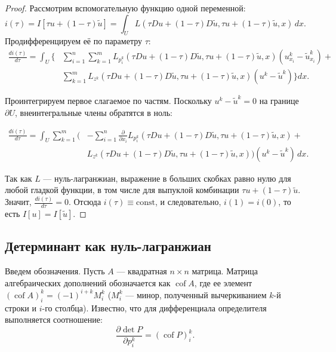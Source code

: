 \begin{proof}
    Рассмотрим вспомогательную функцию одной переменной:
    \begin{equation}
        i(\tau) = I[\tau u + (1-\tau)\tilde{u}] 
        = \int_U L(\tau Du + (1-\tau)D\tilde{u}, \tau u + (1-\tau)\tilde{u}, x) \, dx.
    \end{equation}
    Продифференцируем её по параметру $\tau$:
\begin{equation}
\begin{split}
    \frac{di(\tau)}{d\tau} = \int_U \bigg\{ 
    &\sum_{i=1}^n \sum_{k=1}^m L_{p_i^k}(
      \tau Du + (1-\tau)D\tilde{u}, \tau u + (1-\tau)\tilde{u}, x
      )(u_{x_i}^k - \tilde{u}_{x_i}^k) + \\
    &\sum_{k=1}^m L_{z^k}(
      \tau Du + (1-\tau)D\tilde{u}, \tau u + (1-\tau)\tilde{u}, x
      ) (u^k - \tilde{u}^k)
    \bigg\} dx.
\end{split}
\end{equation}

Проинтегрируем первое слагаемое по частям. 
Поскольку $u^k - \tilde{u}^k = 0$ на границе $\partial U$, 
внеинтегральные члены обратятся в ноль:

\begin{equation}
\begin{split}
    \frac{di(\tau)}{d\tau} = \int_U \sum_{k=1}^m \bigg( 
    &- \sum_{i=1}^n \frac{\partial}{\partial x_i} L_{p_i^k}(
      \tau Du + (1-\tau)D\tilde{u}, \tau u + (1-\tau)\tilde{u}, x
      ) + \\
    &L_{z^k}(
      \tau Du + (1-\tau)D\tilde{u}, \tau u + (1-\tau)\tilde{u}, x
      ) 
    \bigg) (u^k - \tilde{u}^k) \, dx.
\end{split}
\end{equation}

Так как $L$ --- нуль-лагранжиан, выражение в больших скобках равно нулю 
для любой гладкой функции, в том числе для выпуклой комбинации 
$\tau u + (1-\tau)\tilde{u}$. Значит, $\frac{di(\tau)}{d\tau} = 0$.
Отсюда $i(\tau) \equiv \mathrm{const}$, и следовательно, $i(1) = i(0)$, 
то есть $I[u] = I[\tilde{u}]$.
\end{proof}

\subsection{Детерминант как нуль-лагранжиан}

Введем обозначения. Пусть $A$ --- квадратная $n \times n$ матрица. Матрица алгебраических дополнений обозначается как $\operatorname{cof} A$, где ее элемент $(\operatorname{cof} A)_i^k = (-1)^{i+k} M_i^k$ ($M_i^k$ --- минор, полученный вычеркиванием $k$-й строки и $i$-го столбца). 
Известно, что для дифференциала определителя выполняется соотношение:
\begin{equation}
    \frac{\partial \det P}{\partial p_i^k} = (\operatorname{cof} P)_i^k.
\end{equation}


